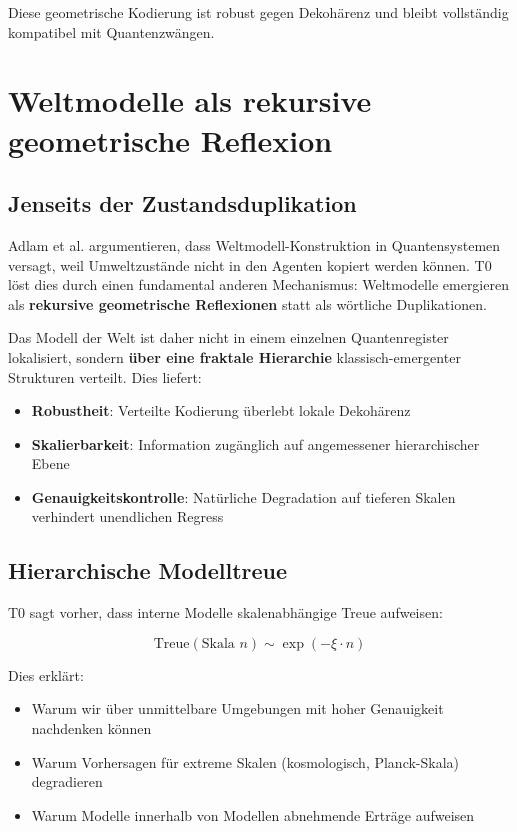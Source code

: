 	Diese geometrische Kodierung ist robust gegen Dekohärenz und bleibt vollständig kompatibel mit Quantenzwängen.
	
	\section{Weltmodelle als rekursive geometrische Reflexion}
	
	\subsection{Jenseits der Zustandsduplikation}
	
	Adlam et al. argumentieren, dass Weltmodell-Konstruktion in Quantensystemen versagt, weil Umweltzustände nicht in den Agenten kopiert werden können. T0 löst dies durch einen fundamental anderen Mechanismus: Weltmodelle emergieren als \textbf{rekursive geometrische Reflexionen} statt als wörtliche Duplikationen.
	
	Das \glqq Modell der Welt\grqq{} ist daher nicht in einem einzelnen Quantenregister lokalisiert, sondern \textbf{über eine fraktale Hierarchie} klassisch-emergenter Strukturen verteilt. Dies liefert:
	
	\begin{itemize}
		\item \textbf{Robustheit}: Verteilte Kodierung überlebt lokale Dekohärenz
		\item \textbf{Skalierbarkeit}: Information zugänglich auf angemessener hierarchischer Ebene
		\item \textbf{Genauigkeitskontrolle}: Natürliche Degradation auf tieferen Skalen verhindert unendlichen Regress
	\end{itemize}
	
	\subsection{Hierarchische Modelltreue}
	
	T0 sagt vorher, dass interne Modelle skalenabhängige Treue aufweisen:
	
	\[
	\text{Treue}(\text{Skala } n) \sim \exp\left(-\xi \cdot n\right)
	\]
	
	Dies erklärt:
	\begin{itemize}
		\item Warum wir über unmittelbare Umgebungen mit hoher Genauigkeit nachdenken können
		\item Warum Vorhersagen für extreme Skalen (kosmologisch, Planck-Skala) degradieren
		\item Warum \glqq Modelle innerhalb von Modellen\grqq{} abnehmende Erträge aufweisen
	\end{itemize}
	
